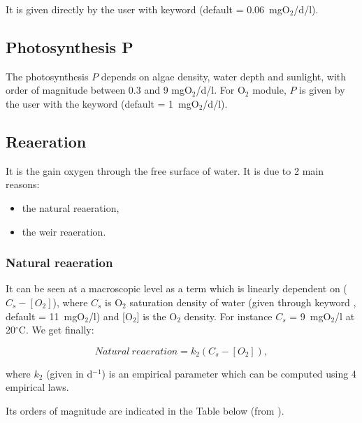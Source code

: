 It is given directly by the user with keyword 
(default = 0.06~mgO$_2$/d/l).


\subsection{Photosynthesis P}

The photosynthesis $P$ depends on algae density,
water depth and sunlight,
with order of magnitude between 0.3 and 9 mgO$_2$/d/l.
For O$_2$ module, $P$ is given by the user with the keyword
 (default = 1~mgO$_2$/d/l).


\subsection{Reaeration}

It is the gain oxygen through the free surface of water.
It is due to 2 main reasons:
\begin{itemize}
\item the natural reaeration,
\item the weir reaeration.
\end{itemize}

\subsubsection{Natural reaeration}
It can be seen at a macroscopic level
as a term which is linearly dependent on ($C_s-[O_2]$),
where $C_s$ is O$_2$ saturation density of water
(given through keyword ,
default = 11~mgO$_2$/l) and [O$_2$] is the O$_2$ density.
For instance $C_s$ = 9~mgO$_2$/l at 20$^\circ$C.
We get finally:

\begin{equation*}
Natural~reaeration = k_2(C_s-[O_2]),
\end{equation*}

where $k_2$ (given in d$^{-1}$) is an empirical parameter
which can be computed using 4 empirical laws.

Its orders of magnitude are indicated in the Table below
(from \cite{tchobanoglous_wq_1985}).\\


